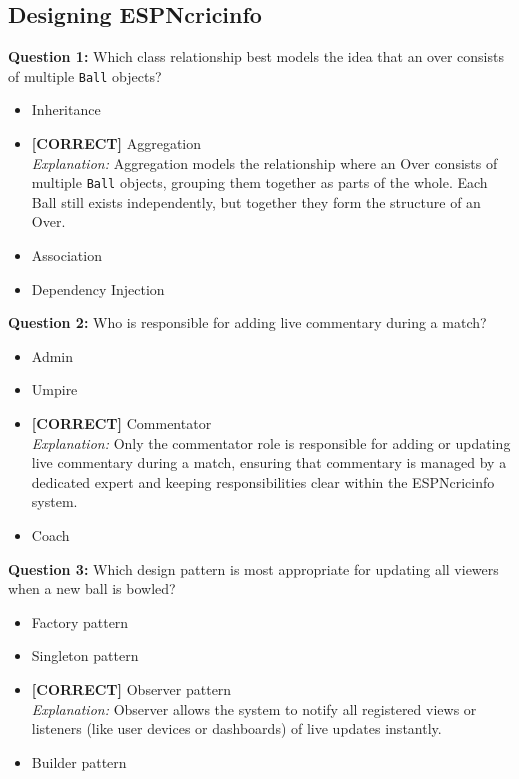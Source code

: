 \subsection*{Designing ESPNcricinfo}
\vspace{0.3cm}
\noindent
\textbf{Question 1:} Which class relationship best models the idea that an over consists of multiple \texttt{Ball} objects?
\\[0.2cm]
\begin{itemize}
 \item Inheritance
 \item \textbf{[CORRECT]} Aggregation
\\[0.1cm]
\textit{Explanation:} 
Aggregation models the relationship where an Over consists of multiple \texttt{Ball} objects, grouping them together as parts of the whole. Each Ball still exists independently, but together they form the structure of an Over.
 \item Association
 \item Dependency Injection
\end{itemize}
\vspace{0.3cm}
\noindent
\textbf{Question 2:} Who is responsible for adding live commentary during a match?
\\[0.2cm]
\begin{itemize}
 \item Admin
 \item Umpire
 \item \textbf{[CORRECT]} Commentator
\\[0.1cm]
\textit{Explanation:} 
Only the commentator role is responsible for adding or updating live commentary during a match, ensuring that commentary is managed by a dedicated expert and keeping responsibilities clear within the ESPNcricinfo system.
 \item Coach
\end{itemize}
\vspace{0.3cm}
\noindent
\textbf{Question 3:} Which design pattern is most appropriate for updating all viewers when a new ball is bowled?
\\[0.2cm]
\begin{itemize}
 \item Factory pattern
 \item Singleton pattern
 \item \textbf{[CORRECT]} Observer pattern
\\[0.1cm]
\textit{Explanation:} 
Observer allows the system to notify all registered views or listeners (like user devices or dashboards) of live updates instantly.
 \item Builder pattern
\end{itemize}
